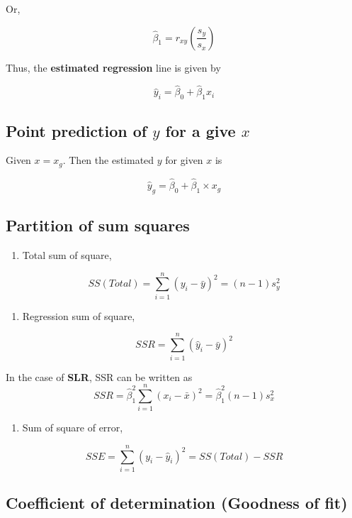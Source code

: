 \documentclass[
  11pt,
  letterpaper,
  DIV=11,
  numbers=noendperiod]{scrreprt}
\providecommand{\tightlist}{%
  \setlength{\itemsep}{0pt}\setlength{\parskip}{0pt}}
\begin{document}
Or,

\[\hat \beta_1=r_{xy} \left (\frac{s_y}{s_x}\right )\]

Thus, the \textbf{estimated regression} line is given by

\[\hat y_i=\hat \beta_0+\hat \beta_1 x_i\]

\subsection{\texorpdfstring{Point prediction of \(y\) for a give
\(x\)}{Point prediction of y for a give x}}\label{point-prediction-of-y-for-a-give-x}

Given \(x=x_g\). Then the estimated \(y\) for given \(x\) is

\[\hat y_g=\hat \beta _0+\hat \beta_1 \times x_g\]

\subsection{Partition of sum squares}\label{partition-of-sum-squares}

\begin{enumerate}
\def\labelenumi{\roman{enumi})}
\tightlist
\item
  Total sum of square,
\end{enumerate}

\[SS(Total)=\sum_{i=1}^n (y_i-\bar y)^2=(n-1) s^2_y\]

\begin{enumerate}
\def\labelenumi{\roman{enumi})}
\setcounter{enumi}{1}
\tightlist
\item
  Regression sum of square,
\end{enumerate}

\[SSR=\sum_{i=1}^n (\hat y_i-\bar y)^2 \]

In the case of \textbf{SLR}, SSR can be written as
\[SSR=\hat \beta_1^2\sum_{i=1}^n (x_i-\bar x)^2=\hat \beta_1^2 (n-1)s_x^2\]

\begin{enumerate}
\def\labelenumi{\roman{enumi})}
\setcounter{enumi}{2}
\tightlist
\item
  Sum of square of error,
\end{enumerate}

\[SSE=\sum_{i=1}^n (y_i-\hat y_i)^2=SS(Total)-SSR\]

\subsection{Coefficient of determination (Goodness of
fit)}\label{coefficient-of-determination-goodness-of-fit}
\end{document}
